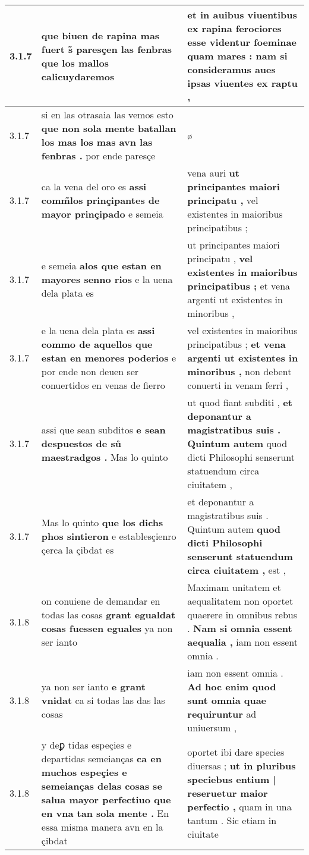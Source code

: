 \begin{tabular}{|p{1cm}|p{6.5cm}|p{6.5cm}|}
3.1.7 & que biuen de rapina \textbf{ mas fuert s̃ paresçen las fenbras } que los mallos calicuydaremos & et in auibus viuentibus \textbf{ ex rapina ferociores esse videntur foeminae quam mares : } nam si consideramus aues ipsas viuentes ex raptu , \\\hline
3.1.7 & si en las otrasaia las vemos esto \textbf{ que non sola mente batallan los mas los mas avn las fenbras . } por ende paresçe & ø \\\hline
3.1.7 & ca la vena del oro es \textbf{ assi comm̃los prinçipantes de mayor prinçipado } e semeia & vena auri \textbf{ ut principantes maiori principatu , } vel existentes in maioribus principatibus ; \\\hline
3.1.7 & e semeia \textbf{ alos que estan en mayores senno rios } e la uena dela plata es & ut principantes maiori principatu , \textbf{ vel existentes in maioribus principatibus ; } et vena argenti ut existentes in minoribus , \\\hline
3.1.7 & e la uena dela plata es \textbf{ assi commo de aquellos que estan en menores poderios } e por ende non deuen ser conuertidos en venas de fierro & vel existentes in maioribus principatibus ; \textbf{ et vena argenti ut existentes in minoribus , } non debent conuerti in venam ferri , \\\hline
3.1.7 & assi que sean subditos \textbf{ e sean despuestos de sů maestradgos . } Mas lo quinto & ut quod fiant subditi , \textbf{ et deponantur a magistratibus suis . Quintum autem } quod dicti Philosophi senserunt statuendum circa ciuitatem , \\\hline
3.1.7 & Mas lo quinto \textbf{ que los dichs phos sintieron } e establesçienro çerca la çibdat es & et deponantur a magistratibus suis . Quintum autem \textbf{ quod dicti Philosophi senserunt statuendum circa ciuitatem , } est , \\\hline
3.1.8 & on conuiene de demandar en todas las cosas \textbf{ grant egualdat cosas fuessen eguales } ya non ser ianto & Maximam unitatem et aequalitatem non oportet quaerere in omnibus rebus . \textbf{ Nam si omnia essent aequalia , } iam non essent omnia . \\\hline
3.1.8 & ya non ser ianto \textbf{ e grant vnidat } ca si todas las das las cosas & iam non essent omnia . \textbf{ Ad hoc enim quod sunt omnia quae requiruntur } ad uniuersum , \\\hline
3.1.8 & y deꝑ tidas espeçies e departidas semeianças \textbf{ ca en muchos espeçies e semeianças delas cosas se salua mayor perfectiuo que en vna tan sola mente . } En essa misma manera avn en la çibdat & oportet ibi dare species diuersas ; \textbf{ ut in pluribus speciebus entium | reseruetur maior perfectio , } quam in una tantum . Sic etiam in ciuitate \\\hline

\end{tabular}
